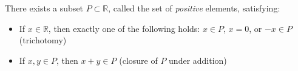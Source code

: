 There exists a subset $P \subset \mathbb{R}$, called the set of \textit{positive} elements, satisfying:
\begin{itemize}
\item[O1.] If $x \in \mathbb{R}$, then exactly one of the following holds: $x \in P$, $x = 0$, or $-x \in P$ \hfill (trichotomy)
\item[O2.] If $x, y \in P$, then $x + y \in P$ \hfill (closure of $P$ under addition)
\end{itemize}
